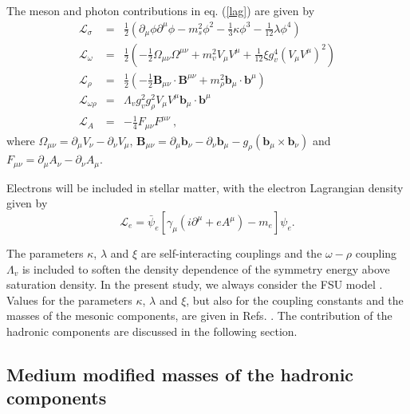 \documentclass[aps,prc,nofootinbib,twocolumn,showpacs]{revtex4-1}
\begin{document}
The meson and  photon contributions in eq. (\ref{lag}) are given by
\begin{eqnarray}
\mathcal{L}_{{\sigma }} &=&\frac{1}{2}\left( \partial _{\mu }\phi \partial %
^{\mu }\phi -m_{s}^{2}\phi ^{2}-\frac{1}{3}\kappa \phi ^{3}-\frac{1}{12}%
\lambda \phi ^{4}\right)  \\
\mathcal{L}_{{\omega }} &=&\frac{1}{2} \left(-\frac{1}{2} \Omega _{\mu \nu }
\Omega ^{\mu \nu }+ m_{v}^{2}V_{\mu }V^{\mu }
+\frac{1}{12}\xi g_{v}^{4}(V_{\mu}V^{\mu })^{2} 
\right) \\
\mathcal{L}_{{\rho }} &=&\frac{1}{2} \left(-\frac{1}{2}
\mathbf{B}_{\mu \nu }\cdot \mathbf{B}^{\mu
\nu }+ m_{\rho }^{2}\mathbf{b}_{\mu }\cdot \mathbf{b}^{\mu } \right)\\
\mathcal{L}_{\omega \rho } &=& \Lambda_v g_v^2 g_\rho^2 V_{\mu }V^{\mu }
\mathbf{b}_{\mu }\cdot \mathbf{b}^{\mu }\\
\mathcal{L}_{A} &=&-\frac{1}{4} F_{\mu \nu }F ^{\mu \nu }~,
\end{eqnarray}
where $\Omega _{\mu \nu }=\partial _{\mu }V_{\nu }-\partial _{\nu }V_{\mu }$, 
$\mathbf{B}_{\mu \nu }=\partial _{\mu }\mathbf{b}_{\nu }-\partial _{\nu }
\mathbf{b}
_{\mu }-g_{\rho }(\mathbf{b}_{\mu }\times \mathbf{b}_{\nu })$ and $F_{\mu \nu }=\partial _{\mu }A_{\nu }-\partial _{\nu }A_{\mu }$.


Electrons will be included in stellar matter, with  the electron Lagrangian density  given by
\begin{equation}
\mathcal{L}_e=\bar \psi_e\left[\gamma_\mu\left(i\partial^{\mu}+ e A^{\mu} 
\right)-m_e\right]\psi_e.
\label{lage}
\end{equation}

The  parameters $\kappa$, $\lambda$ and $\xi$ are
self-interacting  couplings and the  $\omega-\rho$ coupling
$\Lambda_v$ is included to soften the density dependence of the
symmetry energy above saturation density. 
In the present study, we  always consider the FSU model \cite{fsu}. 
Values for the parameters $\kappa$, $\lambda$ and $\xi$, but also for the coupling constants
and the masses of the mesonic  components, are given in Refs. \cite{fsu,ferreira12}.
The contribution of the hadronic components are discussed in the following section.



\subsection{Medium modified masses of the hadronic components}
\end{document}
